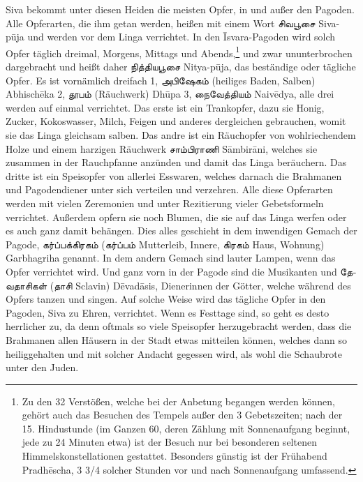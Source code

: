 \documentclass{article}
\newcommand{\TamilText}[1]{\texttamil{#1}}
\newcommand{\tam}[1]{\TamilText{#1}}
\begin{document}
Siva bekommt unter diesen Heiden die meisten Opfer, in und außer den Pagoden. Alle Opferarten, die ihm getan werden, heißen mit einem Wort \tam{சிவபூசை} Siva-p\={u}ja und werden vor dem Linga verrichtet. In den \={I}svara-Pagoden wird solch Opfer täglich dreimal, Morgens, Mittags und Abends,\footnote{Zu den 32 Verstößen, welche bei der Anbetung begangen werden können, gehört auch das Besuchen des Tempels außer den 3 Gebetszeiten; nach der 15. Hindustunde (im Ganzen 60, deren Zählung mit Sonnenaufgang beginnt, jede zu 24 Minuten etwa) ist der Besuch nur bei besonderen seltenen Himmelskonstellationen gestattet. Besonders günstig ist der Frühabend Pradh\={e}scha, 3 3/4 solcher Stunden vor und nach Sonnenaufgang umfassend.} und zwar ununterbrochen dargebracht und heißt daher \tam{நித்தியபூசை} Nitya-p\={u}ja, das beständige oder tägliche Opfer. Es ist vornämlich dreifach 1, \tam{அபிஷேகம்} (heiliges Baden, Salben) Abhisch\={e}ka 2, \tam{தூபம்} (Räuchwerk) Dh\={u}pa 3, \tam{நைவேத்தியம்} Naiv\={e}dya, alle drei werden auf einmal verrichtet. Das erste ist ein Trankopfer, dazu sie Honig, Zucker, Kokoswasser, Milch, Feigen und anderes dergleichen gebrauchen, womit sie das Linga gleichsam salben. Das andre ist ein Räuchopfer von wohlriechendem Holze und einem harzigen Räuchwerk \tam{சாம்பிராணி} S\={a}mbir\={a}ni, welches sie zusammen in der Rauchpfanne anzünden und damit das Linga beräuchern. Das dritte ist ein Speisopfer von allerlei Esswaren, welches darnach die Brahmanen und Pagodendiener unter sich verteilen und verzehren. Alle diese Opferarten werden mit vielen Zeremonien und unter Rezitierung vieler Gebetsformeln verrichtet. Außerdem opfern sie noch Blumen, die sie auf das Linga werfen oder es auch ganz damit behängen. Dies alles geschieht in dem inwendigen Gemach der Pagode, \tam{கர்ப்பக்கிரகம்} (\tam{கர்ப்பம்} Mutterleib, Innere, \tam{கிரகம்} Haus, Wohnung) Garbhagriha genannt. In dem andern Gemach sind lauter Lampen, wenn das Opfer verrichtet wird. Und ganz vorn in der Pagode sind die Musikanten und \tam{தேவதாசிகள்} (\tam{தாசி} Sclavin) D\={e}vad\={a}sis, Dienerinnen der Götter, welche während des Opfers tanzen und singen. Auf solche Weise wird das tägliche Opfer in den Pagoden, Siva zu Ehren, verrichtet. Wenn es Festtage sind, so geht es desto herrlicher zu, da denn oftmals so viele Speisopfer herzugebracht werden, dass die Brahmanen allen Häusern in der Stadt etwas mitteilen können, welches dann so heiliggehalten und mit solcher Andacht gegessen wird, als wohl die Schaubrote unter den Juden.
\end{document}
